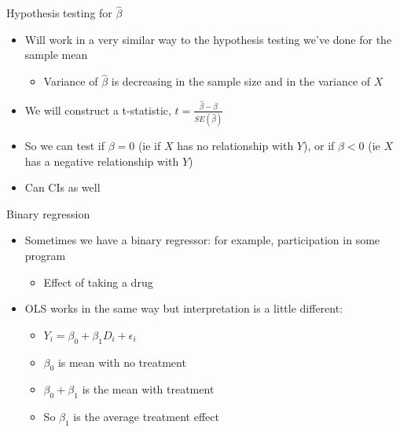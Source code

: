 \documentclass[aspectratio=169]{beamer}
\begin{document}
\begin{frame}{Hypothesis testing for $\hat{\beta}$}
    \begin{itemize}
        \item Will work in a very similar way to the hypothesis testing we've done for the sample mean
        \begin{itemize}
            \item Variance of $\hat{\beta}$ is decreasing in the sample size and in the variance of $X$
        \end{itemize}
        \item We will construct a t-statistic, $t=\frac{\hat{\beta}-\beta}{SE(\hat{\beta})}$
        \item So we can test if $\beta=0$ (ie if $X$ has no relationship with $Y$), or if $\beta<0$ (ie $X$ has a negative relationship with $Y$)
        \item Can CIs as well
    \end{itemize}
\end{frame}

\begin{frame}{Binary regression}
    \begin{itemize}
        \item Sometimes we have a binary regressor: for example, participation in some program
        \begin{itemize}
            \item Effect of taking a drug
        \end{itemize}
        \item OLS works in the same way but interpretation is a little different:
        \begin{itemize}
            \item $Y_i = \beta_0 + \beta_1 D_i + \epsilon_i$
            \item $\beta_0$ is mean with no treatment
            \item $\beta_0 + \beta_1$ is the mean with treatment
            \item So $\beta_1$ is the average treatment effect
        \end{itemize}
    \end{itemize}
\end{frame}
\end{document}

